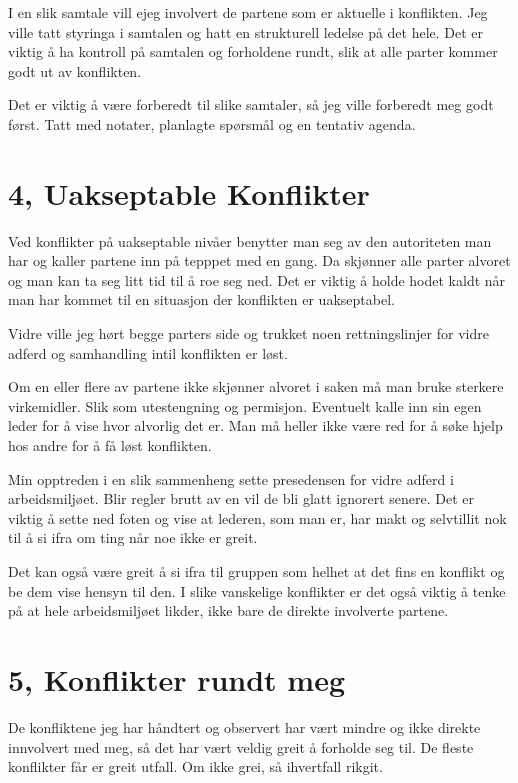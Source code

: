 \documentclass[12pt, a4paper]{article}
\begin{document}
I en slik samtale vill ejeg involvert de partene som er aktuelle i konflikten.
Jeg ville tatt styringa i samtalen og hatt en strukturell ledelse på det hele.
Det er viktig å ha kontroll på samtalen og forholdene rundt, slik at alle
parter kommer godt ut av konflikten. 

Det er viktig å være forberedt til slike samtaler, så jeg ville forberedt meg
godt først. Tatt med notater, planlagte spørsmål og en tentativ agenda.   

\section{4, Uakseptable Konflikter}
Ved konflikter på uakseptable nivåer benytter man seg av den autoriteten man
har og kaller partene inn på tepppet med en gang. Da skjønner alle parter
alvoret og man kan ta seg litt tid til å roe seg ned. Det er viktig å holde
hodet kaldt når man har kommet til en situasjon der konflikten er uakseptabel. 

Vidre ville jeg hørt begge parters side og trukket noen rettningslinjer for
vidre adferd og samhandling intil konflikten er løst. 

Om en eller flere av partene ikke skjønner alvoret i saken må man bruke
sterkere virkemidler. Slik som utestengning og permisjon. Eventuelt kalle inn
sin egen leder for å vise hvor alvorlig det er. Man må heller ikke være red for
å søke hjelp hos andre for å få løst konflikten.  

Min opptreden i en slik sammenheng sette presedensen for vidre adferd i
arbeidsmiljøet. Blir regler brutt av en vil de bli glatt ignorert senere. Det
er viktig å sette ned foten og vise at lederen, som man er, har makt og
selvtillit nok til å si ifra om ting når noe ikke er greit. 

Det kan også være greit å si ifra til gruppen som helhet at det fins en
konflikt og be dem vise hensyn til den. I slike vanskelige konflikter er det
også viktig å tenke på at hele arbeidsmiljøet likder, ikke bare de direkte
involverte partene.   

\section{5, Konflikter rundt meg}
De konfliktene jeg har håndtert og observert har vært mindre og ikke direkte
innvolvert med meg, så det har vært veldig greit å forholde seg til.
De fleste konflikter får er greit utfall. Om ikke grei, så ihvertfall rikgit. 
\end{document}
